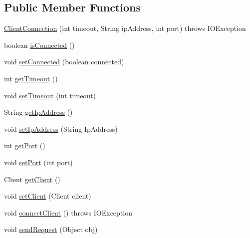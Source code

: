 \subsection*{Public Member Functions}
\begin{DoxyCompactItemize}
\item 
\mbox{\hyperlink{classClient_1_1NetWork_1_1ClientConnection_ab769ef42a838b10b9415084ee7addeab}{Client\+Connection}} (int timeout, String ip\+Address, int port)  throws I\+O\+Exception 
\item 
boolean \mbox{\hyperlink{classClient_1_1NetWork_1_1ClientConnection_a5783f46666a7c84bbb3204931909fc1d}{is\+Connected}} ()
\item 
void \mbox{\hyperlink{classClient_1_1NetWork_1_1ClientConnection_a34be6fb246319ec8f2aa6ee5b6b3e428}{set\+Connected}} (boolean connected)
\item 
int \mbox{\hyperlink{classClient_1_1NetWork_1_1ClientConnection_abe7fc9290de73d965518dd9de09cd409}{get\+Timeout}} ()
\item 
void \mbox{\hyperlink{classClient_1_1NetWork_1_1ClientConnection_ab8a2ea55eded25fb292ae13cef965100}{set\+Timeout}} (int timeout)
\item 
String \mbox{\hyperlink{classClient_1_1NetWork_1_1ClientConnection_a4d0ee3c2ffe3f39cc8e730303606668b}{get\+Ip\+Address}} ()
\item 
void \mbox{\hyperlink{classClient_1_1NetWork_1_1ClientConnection_a8651f578e4701a3de7cf4d158aa4a25f}{set\+Ip\+Address}} (String Ip\+Address)
\item 
int \mbox{\hyperlink{classClient_1_1NetWork_1_1ClientConnection_aa469697b3b88fb6c55947a2bd86a1bce}{get\+Port}} ()
\item 
void \mbox{\hyperlink{classClient_1_1NetWork_1_1ClientConnection_abc5ca369107ad809258d23af01dcf959}{set\+Port}} (int port)
\item 
Client \mbox{\hyperlink{classClient_1_1NetWork_1_1ClientConnection_a68b1b929e307664e06ae49c5535b4f8e}{get\+Client}} ()
\item 
void \mbox{\hyperlink{classClient_1_1NetWork_1_1ClientConnection_a9778327e17e67da3b47451a95c00b4b0}{set\+Client}} (Client client)
\item 
void \mbox{\hyperlink{classClient_1_1NetWork_1_1ClientConnection_a39110498a3fd58e5ddc40b59358fcd94}{connect\+Client}} ()  throws I\+O\+Exception 
\item 
void \mbox{\hyperlink{classClient_1_1NetWork_1_1ClientConnection_aef871fa6a2b3a81d43d6a0b99a538581}{send\+Request}} (Object obj)
\end{DoxyCompactItemize}


